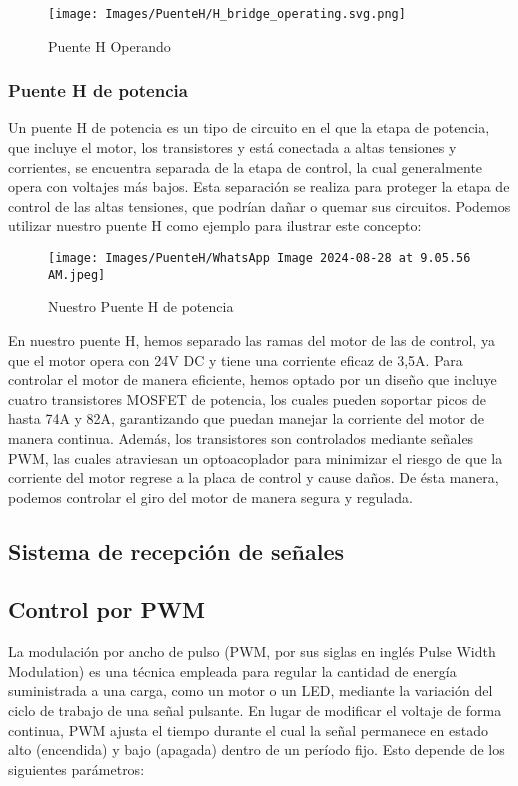 \documentclass{article}
\begin{document}
\begin{figure}[H]
    \centering
    \texttt{[image: Images/PuenteH/H\_bridge\_operating.svg.png]}
    \caption{Puente H Operando}
\end{figure}

\subsubsection{Puente H de potencia}
Un puente H de potencia es un tipo de circuito en el que la etapa de potencia, que incluye el motor, los transistores y está conectada a altas tensiones y corrientes, se encuentra separada de la etapa de control, la cual generalmente opera con voltajes más bajos. Esta separación se realiza para proteger la etapa de control de las altas tensiones, que podrían dañar o quemar sus circuitos. Podemos utilizar nuestro puente H como ejemplo para ilustrar este concepto:

 \begin{figure}[H]
     \centering
     \texttt{[image: Images/PuenteH/WhatsApp Image 2024-08-28 at 9.05.56 AM.jpeg]}
     \caption{Nuestro Puente H de potencia}
     \label{fig:enter-label}
 \end{figure}

En nuestro puente H, hemos separado las ramas del motor de las de control, ya que el motor opera con 24V DC y tiene una corriente eficaz de 3,5A. Para controlar el motor de manera eficiente, hemos optado por un diseño que incluye cuatro transistores MOSFET de potencia, los cuales pueden soportar picos de hasta 74A y 82A, garantizando que puedan manejar la corriente del motor de manera continua. Además, los transistores son controlados mediante señales PWM, las cuales atraviesan un optoacoplador para minimizar el riesgo de que la corriente del motor regrese a la placa de control y cause daños. De ésta manera, podemos controlar el giro del motor de manera segura y regulada.


\subsection{Sistema de recepción de señales}

\subsection{Control por PWM}
La modulación por ancho de pulso (PWM, por sus siglas en inglés Pulse Width Modulation) es una técnica empleada para regular la cantidad de energía suministrada a una carga, como un motor o un LED, mediante la variación del ciclo de trabajo de una señal pulsante. En lugar de modificar el voltaje de forma continua, PWM ajusta el tiempo durante el cual la señal permanece en estado alto (encendida) y bajo (apagada) dentro de un período fijo. Esto depende de los siguientes parámetros:
\end{document}
